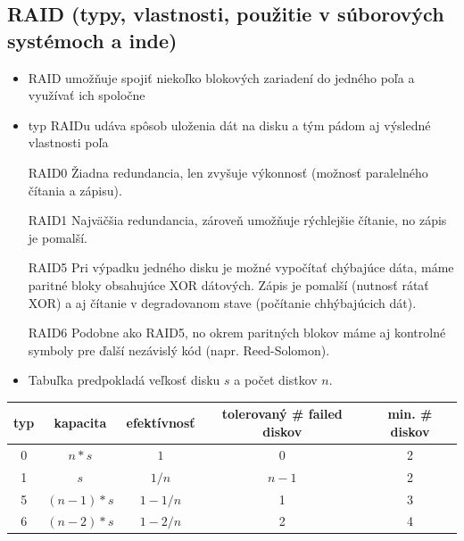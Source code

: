 \documentclass[12pt,a4paper]{article}
\begin{document}
{    \subsection{RAID (typy, vlastnosti, použitie v súborových systémoch a inde)}
    \begin{itemize}
        \item RAID umožňuje spojiť niekoľko blokových zariadení do jedného poľa a využívať ich spoločne
        \item typ RAIDu udáva spôsob uloženia dát na disku a tým pádom aj výsledné vlastnosti poľa
    \end{itemize}
    \begin{itemize}
        \item[RAID0] Žiadna redundancia, len zvyšuje výkonnosť (možnosť paralelného čítania a zápisu).
        \item[RAID1] Najväčšia redundancia, zároveň umožňuje rýchlejšie čítanie, no zápis je pomalší.
        \item[RAID5] Pri výpadku jedného disku je možné vypočítať chýbajúce dáta, máme paritné bloky obsahujúce XOR dátových. Zápis je pomalší (nutnosť rátať XOR) a aj čítanie v degradovanom stave (počítanie chhýbajúcich dát). 
        \item[RAID6] Podobne ako RAID5, no okrem paritných blokov máme aj kontrolné symboly pre ďalší nezávislý kód (napr. Reed-Solomon).
    \end{itemize}
    \begin{itemize}
        \item Tabuľka predpokladá veľkosť disku $s$ a počet distkov $n$.
    \end{itemize}
    \begin{table}[htbp]
        \centering
        \begin{tabular}{|c|c|c|c|c|}
        \hline
            typ & kapacita & efektívnosť & tolerovaný \# failed diskov & min. \# diskov \\\hline
            0 & $n*s$ & $1$ & 0 & 2 \\\hline
            1 & $s$ & $1/n$ & $n-1$ & 2 \\\hline
            5 & $(n-1)* s$ & $1-1/n$ & 1 & 3 \\\hline
            6 & $(n-2)* s$ & $1-2/n$ & 2 & 4 \\\hline
            

\end{tabular}
\end{table}}
\end{document}
